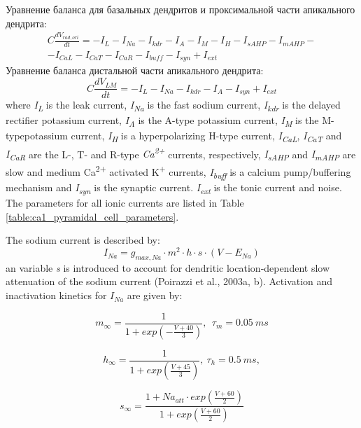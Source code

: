 \documentclass[a4paper,12pt]{article}
\begin{document}
Уравнение баланса для базальных дендритов и проксимальной части апикального дендрита:
\begin{eqnarray}
C\frac{dV_{rad,ori}}{dt} =-I_L-I_{Na}-I_{kdr}-I_A-I_M-I_H-I_{sAHP}-I_{mAHP}- \nonumber \\-I_{CaL}-I_{CaT}-I_{CaR}-I_{buff}-I_{syn}+I_{ext}
\end{eqnarray}
Уравнение баланса дистальной части апикального дендрита:
\begin{equation}
C\frac{dV_{LM}}{dt}=-I_L-I_{Na}-I_{kdr}-I_A-I_{syn}+I_{ext}
\end{equation}
where \textit{I\textsubscript{L}} is the leak current,  \textit{I\textsubscript{Na}} is the fast sodium current, \textit{I\textsubscript{kdr}} is the delayed rectifier potassium current, \textit{I\textsubscript{A}} is the A-type potassium current, \textit{I\textsubscript{M}}
is the M-typepotassium current, \textit{I\textsubscript{H}} is a hyperpolarizing H-type current,
\textit{I\textsubscript{CaL}}, \textit{I\textsubscript{CaT}} and
\textit{I\textsubscript{CaR}} are the L-, T- and R-type \textit{Ca\textsuperscript{2+}} currents, respectively,
\textit{I\textsubscript{sAHP}} and \textit{I\textsubscript{mAHP}} are
slow and medium Ca\textsuperscript{2+} activated K\textsuperscript{+} currents,\textit{ I\textsubscript{buff}}
is a calcium pump/buffering mechanism and \textit{I\textsubscript{syn}} is the synaptic current. \textit{ I\textsubscript{ext}} is the tonic current and noise. The
parameters for all ionic currents are listed in Table \ref{table:ca1_pyramidal_cell_parameters}. \par
The sodium current is described by:
\begin{equation}
I_{Na}= g_{max, Na}\cdot m^2\cdot h\cdot s\cdot (V-E_{Na})
\end{equation}
an variable \textit{s} is introduced to account for dendritic location‑dependent slow attenuation of the sodium current (Poirazzi et al., 2003a, b). Activation and inactivation kinetics for ${I_{Na}}$ are given by:

\begin{equation}
m_{\infty}=\frac {1}{1+exp(-\frac{V+40} {3})} , \ \ \tau_m=0.05 \ ms
\end{equation}

\begin{equation}
h_{\infty}=\frac {1}{1+exp(\frac{V+45}{3})},  \  \tau_h = 0.5 \ ms,
\end{equation}

\begin{equation}
s_{\infty}=\frac{1+Na_{att}\cdot exp(\frac{V+60}{2})}{1+exp(\frac{V+60}{2})}
\end{equation}
\end{document}
